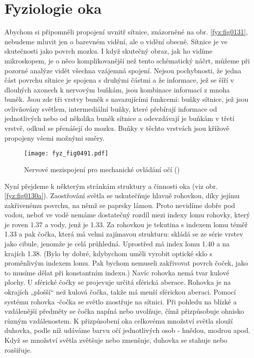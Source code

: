   \section{Fyziologie oka}\label{fyz:IchapXXXVIsecII}
    Abychom si připomněli propojení uvnitř sítnice, znázorněné na obr. \ref {fyz:fig0131}, nebudeme
    mluvit jen o barevném vidění, ale o vidění obecně. Sítnice je ve skutečnosti jako povrch mozku.
    I když skutečný obraz, jak ho vidíme mikroskopem, je o něco komplikovanější než tento
    schématický náčrt, můžeme při pozorné analýze vidět všechna vzájemná spojení. Nejsou
    pochybnosti, že jedna část povrchu sítnice je spojena s druhými částmi a že informace, jež se
    šíří v dlouhých axonech k nervovým buňkám, jsou kombinace informací z mnoha buněk. Jsou zde tři
    vrstvy buněk s navazujícími funkcemi: buňky sítnice, jež jsou ovlivňovány světlem, intermediální
    buňky, které přebírají informace od jednotlivých nebo od několika buněk sítnice a odevzdávají je
    buňkám v třetí vrstvě, odkud se přenášejí do mozku. Buňky v těchto vrstvách jsou křížově
    propojeny všemi možnými směry.
    
    \begin{figure}[ht!] %
      \centering
      \texttt{[image: fyz\_fig0491.pdf]}
      \caption{Nervové mezispojení pro mechanické ovládání očí (\cite[s.~697]{Feynman01})}
      \label{fyz:fig0491}
    \end{figure}

    Nyní přejdeme k některým stránkám struktury a činnosti oka (viz obr. \ref {fyz:fig0130a}).
    Zaostřování světla se uskutečňuje hlavně rohovkou, díky jejímu zakřivenému povrchu, na němž se
    paprsky lámou. Proto nevidíme dobře pod vodou, neboť ve vodě nemáme dostatečný rozdíl mezi
    indexy lomu rohovky, který je roven \num{1.37} a vody, jenž je \num{1.33}. Za rohovkou je
    tekutina s indexem lomu téměř \num{1.33} a pak čočka, která má velmi zajímavou strukturu: skládá
    se ze série vrstev jako cibule, jenomže je celá průhledná. Uprostřed má index lomu \num{1.40} a
    na krajích \num{1.38}. (Bylo by dobré, kdybychom uměli vyrobit optické sklo s proměnlivým
    indexem lomu. Pak bychom nemuseli zakřivovat povrch čoček, jako to musíme dělat při konstantním
    indexu.) Navíc rohovka nemá tvar kulové plochy. U sférické čočky se projevuje určitá sférická
    aberace. Rohovka je na okrajích „plošší“ než kulová čočka, takže má menší sférickou aberaci.
    Pomocí systému rohovka -čočka se světlo zaostřuje na sítnici. Při pohledu na blízké a
    vzdálenější předměty se čočka napíná nebo uvolňuje, čímž přizpůsobuje ohnisko různým
    vzdálenostem. K přizpůsobení oka celkovému množství světla slouží duhovka, podle níž udáváme
    barvu očí jednotlivých osob - hnědou, modrou apod. Když se množství světla zvětšuje nebo
    zmenšuje, duhovka se stahuje nebo rozšiřuje. 
    
